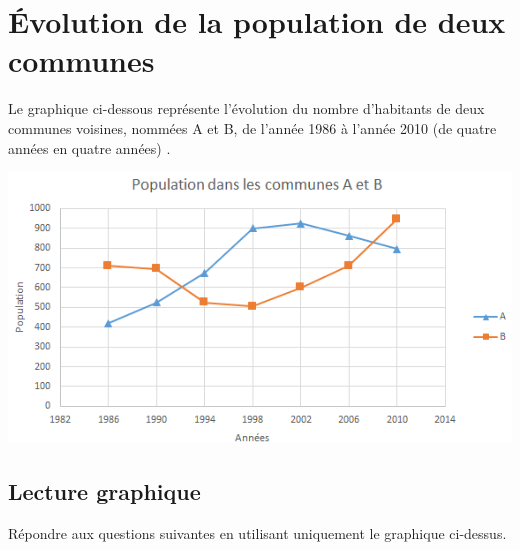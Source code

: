 \section{\'Evolution de la population de deux communes}
	
	
	Le graphique ci-dessous représente l'évolution du nombre d'habitants de deux communes voisines, nommées A et B, de l'année 1986 à l'année 2010 (de quatre années en quatre années) .
	
	\begin{center}
		\includegraphics[scale=0.7]{./graph}
	\end{center}


\subsection{Lecture graphique}				

Répondre aux questions suivantes en utilisant uniquement le graphique ci-dessus.

